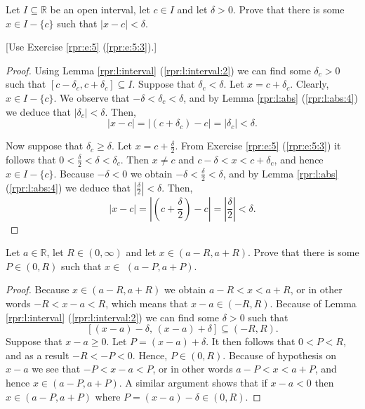 \Newpage
\begin{exercise} %
	Let $I \subseteq \mathbb{R}$ be an open interval, let $c \in I$ and let $\delta > 0$. Prove that there is some $x \in I - \{ c \}$ such that $|x - c| < \delta$.

	\hfill [Use Exercise \ref{rpr:e:5} (\ref{rpr:e:5:3}).]
\end{exercise}

\begin{proof}
	Using Lemma \ref{rpr:l:interval} (\ref{rpr:l:interval:2}) we can find some $\delta_c > 0$ such that $[c - \delta_{c}, c + \delta_{c}] \subseteq I$. Suppose that $\delta_c < \delta$. Let $x = c + \delta_c$. Clearly, $x \in I - \{ c \}$. We observe that $-\delta < \delta_c < \delta$, and by Lemma \ref{rpr:l:abs} (\ref{rpr:l:abs:4}) we deduce that $|\delta_c| < \delta$. Then,
	$$
		|x - c| = |(c + \delta_c) - c| = |\delta_c| < \delta.
	$$

	Now suppose that $\delta_c \geq \delta$. Let $x = c + \frac{\delta}{2}$. From Exercise \ref{rpr:e:5} (\ref{rpr:e:5:3}) it follows that $0 < \frac{\delta}{2} < \delta < \delta_c$. Then $x \neq c$ and $c - \delta < x < c + \delta_c$, and hence $x \in I - \{ c \}$. Because $-\delta < 0$ we obtain $-\delta < \frac{\delta}{2} < \delta$, and by Lemma \ref{rpr:l:abs} (\ref{rpr:l:abs:4}) we deduce that $\left| \frac{\delta}{2} \right| < \delta$. Then,
	$$
		|x - c| = \left| \left( c + \frac{\delta}{2} \right) - c \right| = \left| \frac{\delta}{2} \right| < \delta.
	$$
\end{proof}


\Newpage
\begin{exercise} %
	Let $a \in \mathbb{R}$, let $R \in (0, \infty)$ and let $x \in(a - R, a + R)$. Prove that there is some $P \in(0, R)$ such that $x \in$ $(a - P, a + P)$.
\end{exercise}

\begin{proof}
	Because $x \in (a - R, a + R)$ we obtain $a - R < x < a + R$, or in other words $-R < x - a < R$, which means that $x - a \in (-R, R)$. Because of Lemma \ref{rpr:l:interval} (\ref{rpr:l:interval:2}) we can find some $\delta > 0$ such that
	$$
		[(x - a) - \delta,\, (x - a) + \delta] \subseteq (-R, R).
	$$
	Suppose that $x - a \geq 0$. Let $P = (x - a) + \delta$. It then follows that $0 < P < R$, and as a result $-R < -P < 0$. Hence, $P \in (0, R)$. Because of hypothesis on $x - a$ we see that $-P < x - a < P$, or in other words $a - P < x < a + P$, and hence $x \in (a - P, a + P)$. A similar argument shows that if $x - a < 0$ then $x \in (a - P, a + P)$ where $P = (x - a) - \delta \in (0, R)$.
\end{proof}


